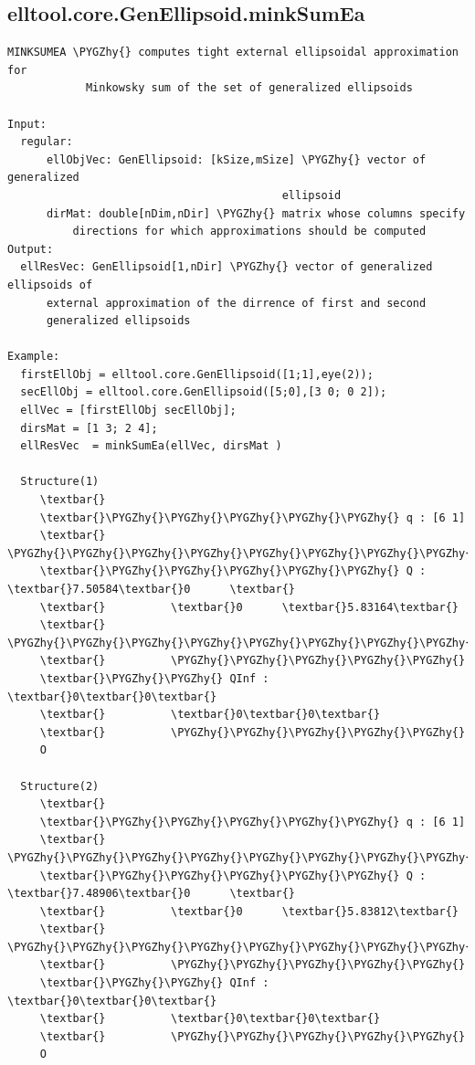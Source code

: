 \documentclass[letterpaper,10pt,english]{sphinxmanual}
\def\PYGZhy{\char`\-}
\begin{document}
\subsection{elltool.core.GenEllipsoid.minkSumEa}
\label{chap_functions:elltool-core-genellipsoid-minksumea}
\begin{Verbatim}[commandchars=\\\{\}]
MINKSUMEA \PYGZhy{} computes tight external ellipsoidal approximation for
            Minkowsky sum of the set of generalized ellipsoids

Input:
  regular:
      ellObjVec: GenEllipsoid: [kSize,mSize] \PYGZhy{} vector of  generalized
                                          ellipsoid
      dirMat: double[nDim,nDir] \PYGZhy{} matrix whose columns specify
          directions for which approximations should be computed
Output:
  ellResVec: GenEllipsoid[1,nDir] \PYGZhy{} vector of generalized ellipsoids of
      external approximation of the dirrence of first and second
      generalized ellipsoids

Example:
  firstEllObj = elltool.core.GenEllipsoid([1;1],eye(2));
  secEllObj = elltool.core.GenEllipsoid([5;0],[3 0; 0 2]);
  ellVec = [firstEllObj secEllObj];
  dirsMat = [1 3; 2 4];
  ellResVec  = minkSumEa(ellVec, dirsMat )

  Structure(1)
     \textbar{}
     \textbar{}\PYGZhy{}\PYGZhy{}\PYGZhy{}\PYGZhy{}\PYGZhy{} q : [6 1]
     \textbar{}          \PYGZhy{}\PYGZhy{}\PYGZhy{}\PYGZhy{}\PYGZhy{}\PYGZhy{}\PYGZhy{}\PYGZhy{}\PYGZhy{}\PYGZhy{}\PYGZhy{}\PYGZhy{}\PYGZhy{}\PYGZhy{}\PYGZhy{}\PYGZhy{}\PYGZhy{}
     \textbar{}\PYGZhy{}\PYGZhy{}\PYGZhy{}\PYGZhy{}\PYGZhy{} Q : \textbar{}7.50584\textbar{}0      \textbar{}
     \textbar{}          \textbar{}0      \textbar{}5.83164\textbar{}
     \textbar{}          \PYGZhy{}\PYGZhy{}\PYGZhy{}\PYGZhy{}\PYGZhy{}\PYGZhy{}\PYGZhy{}\PYGZhy{}\PYGZhy{}\PYGZhy{}\PYGZhy{}\PYGZhy{}\PYGZhy{}\PYGZhy{}\PYGZhy{}\PYGZhy{}\PYGZhy{}
     \textbar{}          \PYGZhy{}\PYGZhy{}\PYGZhy{}\PYGZhy{}\PYGZhy{}
     \textbar{}\PYGZhy{}\PYGZhy{} QInf : \textbar{}0\textbar{}0\textbar{}
     \textbar{}          \textbar{}0\textbar{}0\textbar{}
     \textbar{}          \PYGZhy{}\PYGZhy{}\PYGZhy{}\PYGZhy{}\PYGZhy{}
     O

  Structure(2)
     \textbar{}
     \textbar{}\PYGZhy{}\PYGZhy{}\PYGZhy{}\PYGZhy{}\PYGZhy{} q : [6 1]
     \textbar{}          \PYGZhy{}\PYGZhy{}\PYGZhy{}\PYGZhy{}\PYGZhy{}\PYGZhy{}\PYGZhy{}\PYGZhy{}\PYGZhy{}\PYGZhy{}\PYGZhy{}\PYGZhy{}\PYGZhy{}\PYGZhy{}\PYGZhy{}\PYGZhy{}\PYGZhy{}
     \textbar{}\PYGZhy{}\PYGZhy{}\PYGZhy{}\PYGZhy{}\PYGZhy{} Q : \textbar{}7.48906\textbar{}0      \textbar{}
     \textbar{}          \textbar{}0      \textbar{}5.83812\textbar{}
     \textbar{}          \PYGZhy{}\PYGZhy{}\PYGZhy{}\PYGZhy{}\PYGZhy{}\PYGZhy{}\PYGZhy{}\PYGZhy{}\PYGZhy{}\PYGZhy{}\PYGZhy{}\PYGZhy{}\PYGZhy{}\PYGZhy{}\PYGZhy{}\PYGZhy{}\PYGZhy{}
     \textbar{}          \PYGZhy{}\PYGZhy{}\PYGZhy{}\PYGZhy{}\PYGZhy{}
     \textbar{}\PYGZhy{}\PYGZhy{} QInf : \textbar{}0\textbar{}0\textbar{}
     \textbar{}          \textbar{}0\textbar{}0\textbar{}
     \textbar{}          \PYGZhy{}\PYGZhy{}\PYGZhy{}\PYGZhy{}\PYGZhy{}
     O
\end{Verbatim}
\end{document}
